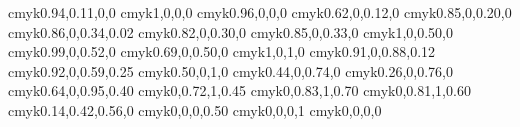       {cmyk}{0.94,0.11,0,0}
          {cmyk}{1,0,0,0}
   {cmyk}{0.96,0,0,0}
       {cmyk}{0.62,0,0.12,0}
     {cmyk}{0.85,0,0.20,0}
      {cmyk}{0.86,0,0.34,0.02}
    {cmyk}{0.82,0,0.30,0}
     {cmyk}{0.85,0,0.33,0}
       {cmyk}{1,0,0.50,0}
   {cmyk}{0.99,0,0.52,0}
      {cmyk}{0.69,0,0.50,0}
         {cmyk}{1,0,1,0}
   {cmyk}{0.91,0,0.88,0.12}
     {cmyk}{0.92,0,0.59,0.25}
     {cmyk}{0.50,0,1,0}
   {cmyk}{0.44,0,0.74,0}
   {cmyk}{0.26,0,0.76,0}
    {cmyk}{0.64,0,0.95,0.40}
     {cmyk}{0,0.72,1,0.45}
         {cmyk}{0,0.83,1,0.70}
         {cmyk}{0,0.81,1,0.60}
           {cmyk}{0.14,0.42,0.56,0}
          {cmyk}{0,0,0,0.50}
         {cmyk}{0,0,0,1}
         {cmyk}{0,0,0,0}
